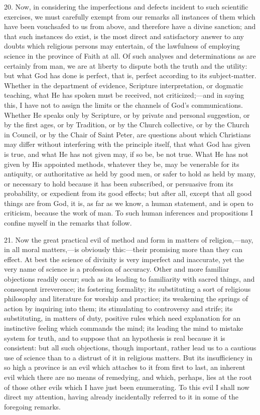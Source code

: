 20. Now, in considering the imperfections and defects incident to
such scientific exercises, we must carefully exempt from our remarks
all instances of them which have been vouchsafed to us from above, and
therefore have a divine sanction; and that such instances do exist, is
the most direct and satisfactory answer to any doubts which religious
persons may entertain, of the lawfulness of employing science in the
province of Faith at all. Of such analyses and determinations as are
certainly from man, we are at liberty to dispute both the truth and
the utility: but what God has done is perfect, that is, perfect
according to its subject-matter. Whether in the department of
evidence, Scripture interpretation, or dogmatic teaching, what He has
spoken must be received, not criticized;—and in saying this, I have
not to assign the limits or the channels of God's communications.
Whether He speaks only by Scripture, or by private and personal
suggestion, or by the first ages, or by Tradition, or by the Church
collective, or by the Church in Council, or by the Chair of Saint
Peter, are questions about which Christians may differ without
interfering with the principle itself, that what God has given is
true, and what He has not given may, if so be, be not true. What He
has not given by His appointed methods, whatever they be, may be
venerable for its antiquity, or authoritative as held by good men, or
safer to hold as held by many, or necessary to hold because it has
been subscribed, or persuasive from its probability, or expedient from
its good effects; but after all, except that all good things are from
God, it is, as far as we know, a human statement, and is open to
criticism, because the work of man. To such human inferences and
propositions I confine myself in the remarks that follow.

21. Now the great practical evil of method and form in matters of
religion,—nay, in all moral matters,—is obviously this:—their
promising more than they can effect. At best the science of divinity
is very imperfect and inaccurate, yet the very name of science is a
profession of accuracy. Other and more familiar objections readily
occur; such as its leading to familiarity with sacred things, and
consequent irreverence; its fostering formality; its substituting a
sort of religious philosophy and literature for worship and practice;
its weakening the springs of action by inquiring into them; its
stimulating to controversy and strife; its substituting, in matters of
duty, positive rules which need explanation for an instinctive feeling
which commands the mind; its leading the mind to mistake system for
truth, and to suppose that an hypothesis is real because it is
consistent: but all such objections, though important, rather lead us
to a cautious use of science than to a distrust of it in religious
matters. But its insufficiency in so high a province is an evil which
attaches to it from first to last, an inherent evil which there are no
means of remedying, and which, perhaps, lies at the root of those
other evils which I have just been enumerating. To this evil I shall
now direct my attention, having already incidentally referred to it in
some of the foregoing remarks.

